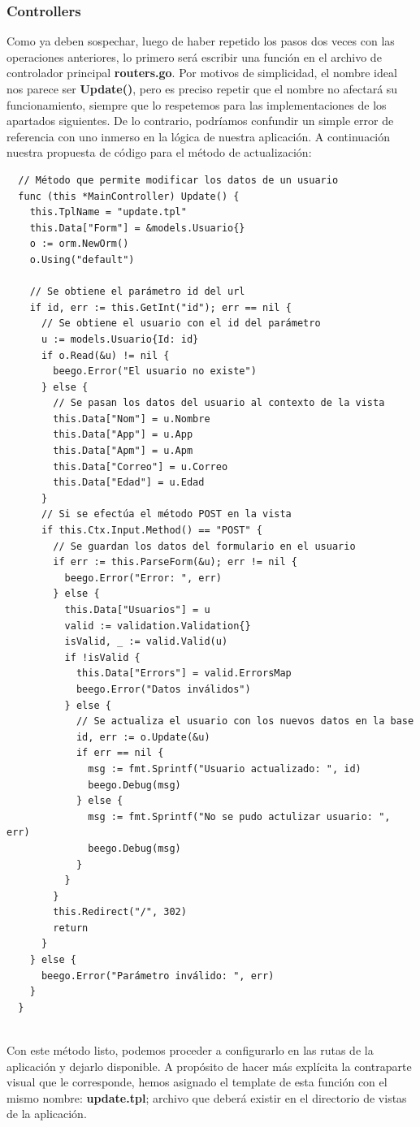 \documentclass[12pt]{article}
\begin{document}
\subsubsection{Controllers}
Como ya deben sospechar, luego de haber repetido los pasos dos veces con las operaciones anteriores,
lo primero será escribir una función en el archivo de controlador principal \textbf{routers.go}.
Por motivos de simplicidad, el nombre ideal nos parece ser \textbf{Update()}, pero es preciso
repetir que el nombre no afectará su funcionamiento, siempre que lo respetemos para las implementaciones
de los apartados siguientes. De lo contrario, podríamos confundir un simple error de referencia con uno
inmerso en la lógica de nuestra aplicación.
A continuación nuestra propuesta de código para el método de actualización:
\begin{verbatim}
  // Método que permite modificar los datos de un usuario
  func (this *MainController) Update() {
    this.TplName = "update.tpl"
    this.Data["Form"] = &models.Usuario{}
    o := orm.NewOrm()
    o.Using("default")

    // Se obtiene el parámetro id del url
    if id, err := this.GetInt("id"); err == nil {
      // Se obtiene el usuario con el id del parámetro
      u := models.Usuario{Id: id}
      if o.Read(&u) != nil {
        beego.Error("El usuario no existe")
      } else {
        // Se pasan los datos del usuario al contexto de la vista
        this.Data["Nom"] = u.Nombre
        this.Data["App"] = u.App
        this.Data["Apm"] = u.Apm
        this.Data["Correo"] = u.Correo
        this.Data["Edad"] = u.Edad
      }
      // Si se efectúa el método POST en la vista
      if this.Ctx.Input.Method() == "POST" {
        // Se guardan los datos del formulario en el usuario
        if err := this.ParseForm(&u); err != nil {
          beego.Error("Error: ", err)
        } else {
          this.Data["Usuarios"] = u
          valid := validation.Validation{}
          isValid, _ := valid.Valid(u)
          if !isValid {
            this.Data["Errors"] = valid.ErrorsMap
            beego.Error("Datos inválidos")
          } else {
            // Se actualiza el usuario con los nuevos datos en la base
            id, err := o.Update(&u)
            if err == nil {
              msg := fmt.Sprintf("Usuario actualizado: ", id)
              beego.Debug(msg)
            } else {
              msg := fmt.Sprintf("No se pudo actulizar usuario: ", err)
              beego.Debug(msg)
            }
          }
        }			
        this.Redirect("/", 302)
        return
      }
    } else {
      beego.Error("Parámetro inválido: ", err)
    }		
  }
  
\end{verbatim}
Con este método listo, podemos proceder a configurarlo en las rutas de la aplicación y dejarlo
disponible.
A propósito de hacer más explícita la contraparte visual que le corresponde, hemos asignado el template de
esta función con el mismo nombre: \textbf{update.tpl}; archivo que deberá existir en el directorio de
vistas de la aplicación.
\end{document}
